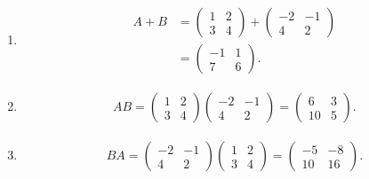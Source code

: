 \documentclass[12pt,oneside]{book}
\begin{document}
\begin{enumerate}
\begin{enumerate}
            \item \begin{align*}
                A + B &= \begin{pmatrix} 
                    1 & 2 \\
                    3 & 4
                \end{pmatrix} + \begin{pmatrix} 
                    -2 & -1 \\
                    4 & 2
                \end{pmatrix} \\
                &= \begin{pmatrix} 
                    -1 & 1 \\
                    7 & 6
                \end{pmatrix}.
            \end{align*}
            \item \begin{align*}
                AB = \begin{pmatrix} 
                    1 & 2 \\
                    3 & 4
                \end{pmatrix} \begin{pmatrix} 
                    -2 & -1 \\
                    4 & 2
                \end{pmatrix} = \begin{pmatrix} 
                    6 & 3 \\
                    10 & 5
                \end{pmatrix}.
            \end{align*}
            \item \begin{align*}
                BA = \begin{pmatrix} 
                    -2 & -1 \\
                    4 & 2
                \end{pmatrix} \begin{pmatrix} 
                    1 & 2 \\
                    3 & 4
                \end{pmatrix} = \begin{pmatrix} 
                    -5 & -8 \\
                    10 & 16
                \end{pmatrix}.

\end{align*}
\end{enumerate}
\end{enumerate}
\end{document}
